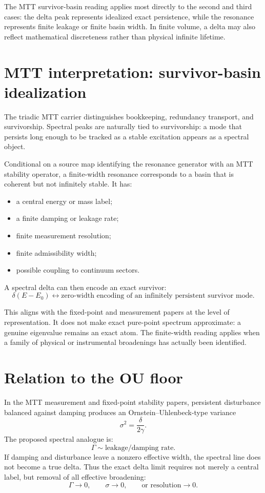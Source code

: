 \documentclass[11pt]{article}
\begin{document}
The MTT survivor-basin reading applies most directly to the second and third cases: the delta peak represents idealized exact persistence, while the resonance represents finite leakage or finite basin width. In finite volume, a delta may also reflect mathematical discreteness rather than physical infinite lifetime.

\section{MTT interpretation: survivor-basin idealization}

The triadic MTT carrier distinguishes bookkeeping, redundancy transport, and survivorship. Spectral peaks are naturally tied to survivorship: a mode that persists long enough to be tracked as a stable excitation appears as a spectral object.

Conditional on a source map identifying the resonance generator with an MTT stability
operator, a finite-width resonance corresponds to a basin that is coherent but not infinitely
stable. It has:
\begin{itemize}
\item a central energy or mass label;
\item a finite damping or leakage rate;
\item finite measurement resolution;
\item finite admissibility width;
\item possible coupling to continuum sectors.
\end{itemize}

A spectral delta can then encode an exact survivor:
\[
\boxed{
\delta(E-E_0)
\longleftrightarrow
\text{zero-width encoding of an infinitely persistent survivor mode}.
}
\]

This aligns with the fixed-point and measurement papers at the level of representation. It
does not make exact pure-point spectrum approximate: a genuine eigenvalue remains an exact
atom. The finite-width reading applies when a family of physical or instrumental broadenings
has actually been identified.

\section{Relation to the OU floor}

In the MTT measurement and fixed-point stability papers, persistent disturbance balanced against damping produces an Ornstein--Uhlenbeck-type variance
\[
\sigma^2=\frac{\delta}{2\gamma}.
\]
The proposed spectral analogue is:
\[
\Gamma \sim \text{leakage/damping rate}.
\]
If damping and disturbance leave a nonzero effective width, the spectral line does not become a true delta. Thus the exact delta limit requires not merely a central label, but removal of all effective broadening:
\[
\Gamma\to0,
\qquad
\sigma\to0,
\qquad
\text{or resolution}\to0.
\]
\end{document}
